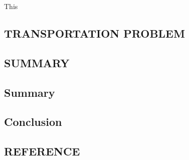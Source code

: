 \documentclass{article}
\begin{document}
This 

\newpage

\begin{center}
	\section{TRANSPORTATION PROBLEM}
\end{center}

\newpage

\begin{center}
	\section{SUMMARY}
\end{center}
\subsection{Summary}
\subsection{Conclusion}

\newpage

\begin{center}
	\section{REFERENCE}
\end{center}
\end{document}
